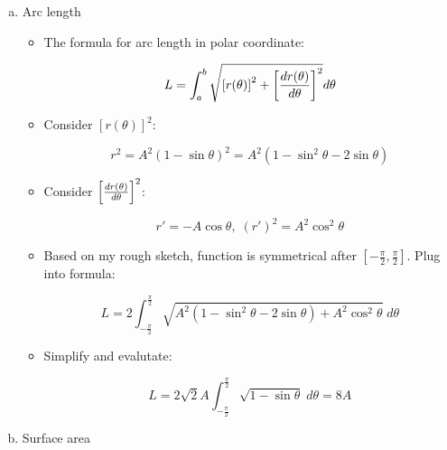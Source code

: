 \documentclass[11pt]{article}
\begin{document}
\begin{enumerate}[a)]

	\item Arc length
	
		\begin{itemize}
		
			\item The formula for arc length in polar coordinate:
			
				\begin{equation*}
					L = \int_a^b \sqrt{ \left[r(\theta)\right]^2 + 
					\left[ {{ dr(\theta) } \over { d\theta }} \right] ^2 } d\theta
				\end{equation*}
			
			\item Consider $\left[r(\theta)\right]^2$:
			
				\begin{equation*}
					r^2 = A^2(1 - \sin\theta)^2 = A^2(1 - \sin^2\theta - 2\sin\theta)
				\end{equation*}
				
			\item Consider $\left[ {{ dr(\theta) } \over { d\theta }} \right] ^2 $:
			
				\begin{equation*}
					r' = -A\cos\theta, \; (r')^2 = A^2\cos^2\theta
				\end{equation*}
				
			\item Based on my rough sketch, function is symmetrical after $[-\frac{\pi}{2}, \frac{\pi}{2}]$. 
			Plug into formula:
			
				\begin{equation*}
					L = 2\int_{-\frac{\pi}{2}}^{\frac{\pi}{2}} \sqrt{ A^2(1 - \sin^2\theta - 2\sin\theta) + A^2\cos^2\theta } \; d\theta
				\end{equation*}
				
			\item Simplify and evalutate:
			
				\begin{equation*}
					L = 2\sqrt{2}A \int_{-\frac{\pi}{2}}^{\frac{\pi}{2}} \sqrt{1 - \sin\theta} \; d\theta = 8A
				\end{equation*}
						
		\end{itemize}
	
	\item Surface area
	
		\begin{itemize}
		

\end{itemize}
\end{enumerate}
\end{document}
